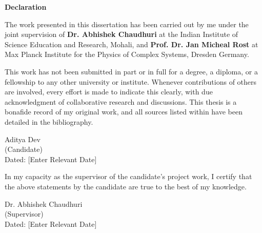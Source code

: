 \begin{center}
    \textbf{\Large Declaration}
\end{center}
The work presented in this dissertation has been carried out by me under the joint supervision of \textbf{Dr. Abhishek Chaudhuri} at the Indian Institute of Science Education and Research, Mohali, and \textbf{Prof. Dr.  Jan Micheal Rost} at Max Planck Institute for the Physics of Complex Systems, Dresden Germany. 

\vspace{0.4cm}

This work has not been submitted in part or in full for a degree, a diploma, or a fellowship to any other university or institute. Whenever contributions of others are involved, every effort is made to indicate this clearly, with due acknowledgment of collaborative research and discussions. This thesis is a bonafide record of my original work, and all sources listed within have been detailed in the bibliography.

\vspace{2cm}

\begin{flushright}
Aditya Dev
\\
(Candidate)
\\
Dated: [Enter Relevant Date]
\end{flushright}

In my capacity as the supervisor of the candidate's project work, I certify that the above statements by the candidate are true to the best of my knowledge.

\vspace{2cm}

\begin{flushright}
Dr. Abhishek Chaudhuri
\\
(Supervisor)
\\
Dated: [Enter Relevant Date]
\end{flushright}
